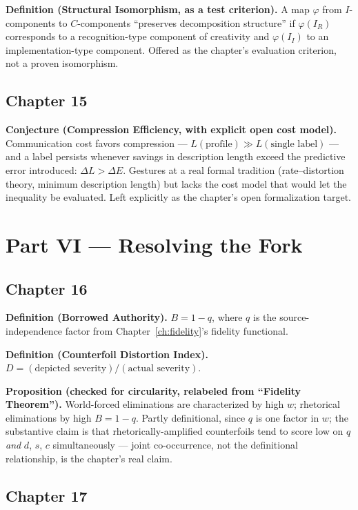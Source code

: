 \textbf{Definition (Structural Isomorphism, as a test criterion).} A map $\varphi$ from $I$-components to $C$-components ``preserves decomposition structure'' if $\varphi(I_R)$ corresponds to a recognition-type component of creativity and $\varphi(I_I)$ to an implementation-type component. Offered as the chapter's evaluation criterion, not a proven isomorphism.

\subsection*{Chapter 15}

\textbf{Conjecture (Compression Efficiency, with explicit open cost model).} Communication cost favors compression --- $L(\text{profile}) \gg L(\text{single label})$ --- and a label persists whenever savings in description length exceed the predictive error introduced: $\Delta L > \Delta E$. Gestures at a real formal tradition (rate--distortion theory, minimum description length) but lacks the cost model that would let the inequality be evaluated. Left explicitly as the chapter's open formalization target.

\section*{Part VI --- Resolving the Fork}

\subsection*{Chapter 16}

\textbf{Definition (Borrowed Authority).} $B = 1 - q$, where $q$ is the source-independence factor from Chapter~\ref{ch:fidelity}'s fidelity functional.

\textbf{Definition (Counterfoil Distortion Index).} $D = (\text{depicted severity}) / (\text{actual severity})$.

\textbf{Proposition (checked for circularity, relabeled from ``Fidelity Theorem'').} World-forced eliminations are characterized by high $w$; rhetorical eliminations by high $B = 1-q$. Partly definitional, since $q$ is one factor in $w$; the substantive claim is that rhetorically-amplified counterfoils tend to score low on $q$ \emph{and} $d$, $s$, $c$ simultaneously --- joint co-occurrence, not the definitional relationship, is the chapter's real claim.

\subsection*{Chapter 17}

